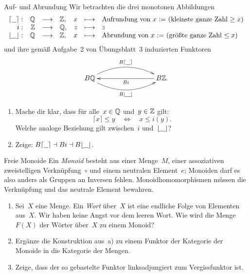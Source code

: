 \documentclass{pizzablatt}
\begin{document}

\begin{aufgabe}{Auf- und Abrundung}
Wir betrachten die drei monotonen Abbildungen
\[ \begin{array}{@{}rrclrcl@{}}
  \lceil\freist\rceil: & \QQ &\longrightarrow& \ZZ, &
  x &\longmapsto& \text{Aufrundung von~$x$ := (kleinste ganze Zahl~$\geq x$)} \\
  i: & \ZZ &\longrightarrow& \QQ, &
  z &\longmapsto& z \\
  \lfloor\freist\rfloor: & \QQ &\longrightarrow& \ZZ, &
  x &\longmapsto& \text{Abrundung von~$x$ := (größte ganze Zahl~$\leq x$)}
\end{array} \]
und ihre gemäß Aufgabe~2 von Übungsblatt~3 induzierten Funktoren
\[ \xymatrixcolsep{7pc}\xymatrix{
  B\QQ
    \ar@/^1.4pc/[r]^{B\lceil\freist\rceil}
    \ar@/_1.4pc/[r]_{B\lfloor\freist\rfloor}
  & B\ZZ. \ar[l]^{Bi}
} \]
\begin{enumerate}
\item Mache dir klar, dass für alle~$x \in \mathbb{Q}$ und~$y \in \mathbb{Z}$ gilt:
\[ \lceil x \rceil \leq y \quad\Longleftrightarrow\quad
  x \leq i(y). \]
Welche analoge Beziehung gilt zwischen~$i$ und~$\lfloor\underline{\ \ }\rfloor$?
\item Zeige: $B\lceil\underline{\ \ }\rceil \dashv Bi \dashv B\lfloor\underline{\ \ }\rfloor$.
\end{enumerate}
\end{aufgabe}

\begin{aufgabe}{Freie Monoide}
Ein \emph{Monoid} besteht aus einer Menge~$M$, einer assoziativen
zweistelligen Verknüpfung~$\circ$ und einem neutralen Element~$e$; Monoiden
darf es also anders als Gruppen an Inversen fehlen. Monoidhomomorphismen müssen
die Verknüpfung und das neutrale Element bewahren.
\begin{enumerate}
\item
Sei~$X$ eine Menge. Ein \emph{Wort} über~$X$ ist eine endliche Folge von
Elementen aus~$X$. Wir haben keine Angst vor dem leeren Wort. Wie wird die
Menge~$F(X)$ der Wörter über~$X$ zu einem Monoid?
\item Ergänze die Konstruktion aus~a) zu einem Funktor der Kategorie der
Monoide in die Kategorie der Mengen.
\item Zeige, dass der so gebastelte Funktor linksadjungiert zum Vergissfunktor
ist.
\end{enumerate}
\end{aufgabe}
\end{document}
